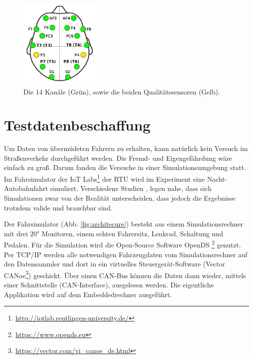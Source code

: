 {\begin{figure}[h] 
  \begin{center}
    \includegraphics[width=4cm]{epoc_sensors}
    \caption[EMOTIV Epoc]{Die 14 Kanäle (Grün), sowie die beiden Qualitätssensoren (Gelb).\label{fig:epoc_sensors}}
  \end{center}
\end{figure}

\section{Testdatenbeschaffung}
\label{chap:data}
Um Daten von übermüdeten Fahrern zu erhalten, kann natürlich kein Versuch im Straßenverkehr durchgeführt werden. Die Fremd- und Eigengefährdung wäre einfach zu groß. Darum fanden die Versuche in einer Simulationsumgebung statt. Im Fahrsimulator der IoT Labs\footnote{\url{http://iotlab.reutlingen-university.de/}} der \acl{RTU} wird im Experiment eine Nacht-Autobahnfahrt simuliert. Verschiedene Studien \cite{Engstrom_2322937}, \cite{Horne_1757738} legen nahe, dass sich  Simulationen zwar von der Realität unterscheiden, dass jedoch die Ergebnisse trotzdem valide und brauchbar sind.

Der Fahrsimulator (Abb. \ref{fig:architecure}) besteht aus einem Simulationsrechner mit drei 20" Monitoren, einem echten Fahrersitz, Lenkrad, Schaltung und Pedalen. Für die Simulation wird die Open-Source Software OpenDS \footnote{\url{https://www.opends.eu}} genutzt. Per TCP/IP werden alle notwendigen Fahrzeugdaten vom Simulationsrechner auf den Datensammler und dort in ein virtuelles Steuergerät-Software (Vector CANoe\footnote{\url{https://vector.com/vi_canoe_de.html}}) geschickt. Über einen CAN-Bus können die Daten dann wieder, mittels einer Schnittstelle (CAN-Interface), ausgelesen werden. Die eigentliche Applikation wird auf dem Embeddedrechner ausgeführt.

}
